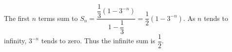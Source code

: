 The first $n$ terms sum to $S_n=\dfrac{\dfrac{1}{3}(1-3^{-n})}{1-\dfrac{1}{3}}=\dfrac{1}{2}(1-3^{-n})$. As $n$ tends to infinity, $3^{-n}$ tends to zero. Thus the infinite sum is $\boxed{\dfrac{1}{2}}$.
